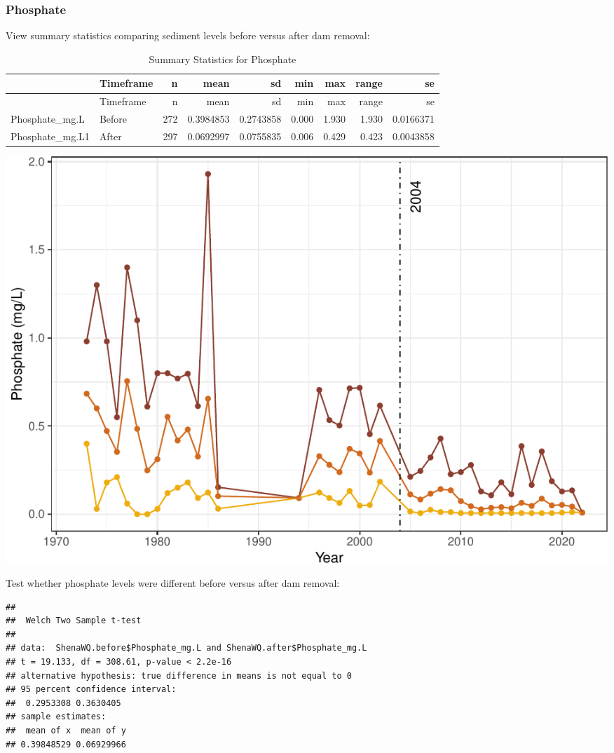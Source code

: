 \documentclass[
  12pt,
]{article}
\begin{document}
\newpage

\hypertarget{phosphate}{%
\subsubsection{Phosphate}\label{phosphate}}

View summary statistics comparing sediment levels before versus after
dam removal:

\begin{longtable}[]{@{}llrrrrrrr@{}}
\caption{Summary Statistics for Phosphate}\tabularnewline
\toprule
& Timeframe & n & mean & sd & min & max & range & se \\
\midrule
\endfirsthead
\toprule
& Timeframe & n & mean & sd & min & max & range & se \\
\midrule
\endhead
Phosphate\_mg.L & Before & 272 & 0.3984853 & 0.2743858 & 0.000 & 1.930 &
1.930 & 0.0166371 \\
Phosphate\_mg.L1 & After & 297 & 0.0692997 & 0.0755835 & 0.006 & 0.429 &
0.423 & 0.0043858 \\
\bottomrule
\end{longtable}

\includegraphics{Project_Template_files/figure-latex/Phosphate_Analysis3-1.pdf}

Test whether phosphate levels were different before versus after dam
removal:

\begin{verbatim}
## 
##  Welch Two Sample t-test
## 
## data:  ShenaWQ.before$Phosphate_mg.L and ShenaWQ.after$Phosphate_mg.L
## t = 19.133, df = 308.61, p-value < 2.2e-16
## alternative hypothesis: true difference in means is not equal to 0
## 95 percent confidence interval:
##  0.2953308 0.3630405
## sample estimates:
##  mean of x  mean of y 
## 0.39848529 0.06929966
\end{verbatim}
\end{document}
